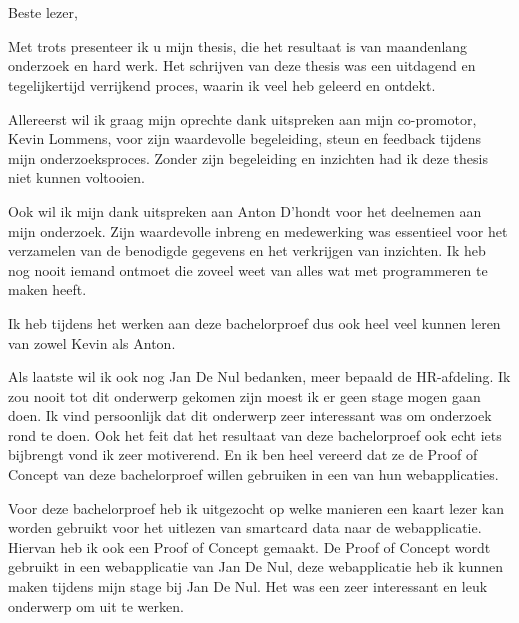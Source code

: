 
\chapter*{}%
\label{ch:voorwoord}

Beste lezer,

Met trots presenteer ik u mijn thesis, die het resultaat is van maandenlang onderzoek en hard werk. Het schrijven van deze thesis was een uitdagend en tegelijkertijd verrijkend proces, waarin ik veel heb geleerd en ontdekt.

Allereerst wil ik graag mijn oprechte dank uitspreken aan mijn co-promotor, Kevin Lommens, voor zijn waardevolle begeleiding, steun en feedback tijdens mijn onderzoeksproces. Zonder zijn begeleiding en inzichten had ik deze thesis niet kunnen voltooien.

Ook wil ik mijn dank uitspreken aan Anton D'hondt voor het deelnemen aan mijn onderzoek. Zijn waardevolle inbreng en medewerking was essentieel voor het verzamelen van de benodigde gegevens en het verkrijgen van inzichten. Ik heb nog nooit iemand ontmoet die zoveel weet van alles wat met programmeren te maken heeft.

Ik heb tijdens het werken aan deze bachelorproef dus ook heel veel kunnen leren van zowel Kevin als Anton. 

Als laatste wil ik ook nog Jan De Nul bedanken, meer bepaald de HR-afdeling. Ik zou nooit tot dit onderwerp gekomen zijn moest ik er geen stage mogen gaan doen. Ik vind persoonlijk dat dit onderwerp zeer interessant was om onderzoek rond te doen. Ook het feit dat het resultaat van deze bachelorproef ook echt iets bijbrengt vond ik zeer motiverend. En ik ben heel vereerd dat ze de Proof of Concept van deze bachelorproef willen gebruiken in een van hun webapplicaties.

Voor deze bachelorproef heb ik uitgezocht op welke manieren een kaart lezer kan worden gebruikt voor het uitlezen van smartcard data naar de webapplicatie. Hiervan heb ik ook een Proof of Concept gemaakt. De Proof of Concept wordt gebruikt in een webapplicatie van Jan De Nul, deze webapplicatie heb ik kunnen maken tijdens mijn stage bij Jan De Nul. Het was een zeer interessant en leuk onderwerp om uit te werken.